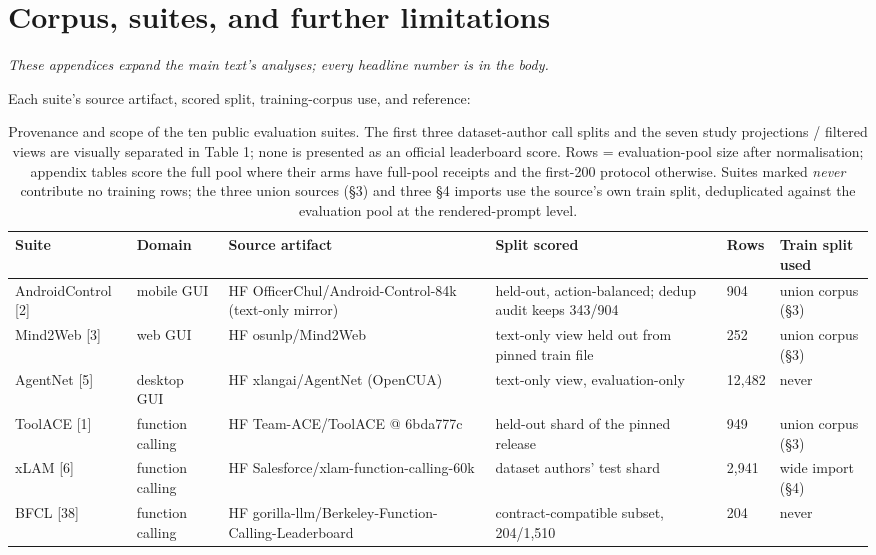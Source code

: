 \documentclass{article}
\begin{document}
\section{Corpus, suites, and further limitations}

\emph{These appendices expand the main text's analyses; every headline number is
in the body.}


Each suite's source artifact, scored split, training-corpus use, and reference:


\begin{table}[htbp]
\caption{Provenance and scope of the ten public evaluation suites. The first three dataset-author call splits and the seven study projections / filtered views are visually separated in Table 1; none is presented as an official leaderboard score. Rows = evaluation-pool size after normalisation; appendix tables score the full pool where their arms have full-pool receipts and the first-200 protocol otherwise. Suites marked \emph{never} contribute no training rows; the three union sources (\S3) and three \S4 imports use the source's own train split, deduplicated against the evaluation pool at the rendered-prompt level.}
\label{tab:suite_sources}
\centering
\footnotesize\setlength{\tabcolsep}{3pt}
\begin{tabularx}{\textwidth}{ll>{\raggedright\arraybackslash}X>{\raggedright\arraybackslash}Xll}
\toprule
Suite & Domain & Source artifact & Split scored & Rows & Train split used \\
\midrule
AndroidControl [2] & mobile GUI & HF {\scriptsize OfficerChul/Android-Control-84k} (text-only mirror) & held-out, action-balanced; dedup audit keeps 343/904 & 904 & union corpus (\S3) \\
Mind2Web [3] & web GUI & HF {\scriptsize osunlp/Mind2Web} & text-only view held out from pinned train file & 252 & union corpus (\S3) \\
AgentNet [5] & desktop GUI & HF {\scriptsize xlangai/AgentNet} (OpenCUA) & text-only view, evaluation-only & 12,482 & never \\
ToolACE [1] & function calling & HF {\scriptsize Team-ACE/ToolACE} @ {\scriptsize 6bda777c} & held-out shard of the pinned release & 949 & union corpus (\S3) \\
xLAM [6] & function calling & HF {\scriptsize Salesforce/xlam-function-calling-60k} & dataset authors' test shard & 2,941 & wide import (\S4) \\
BFCL [38] & function calling & HF {\scriptsize gorilla-llm/Berkeley-Function-Calling-Leaderboard} & contract-compatible subset, 204/1,510 & 204 & never \\

\end{tabularx}
\end{table}
\end{document}
